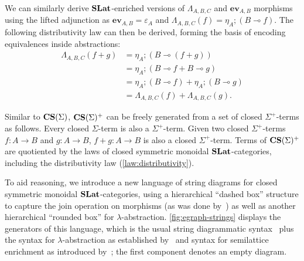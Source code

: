 We can similarly derive $\mathbf{SLat}$-enriched versions of  $\Lambda_{A,B,C}$ and $\textbf{ev}_{A,B}$ morphisms using the lifted adjunction as $\textbf{ev}_{A,B} = \varepsilon_{A}$ and $\Lambda_{A,B,C}(f) = \eta_A; (B \multimap{} f)$.
The following distributivity law can then be derived, forming the basis of encoding equivalences inside abstractions:
\begin{equation}
	\begin{aligned}
		\Lambda_{A,B,C}(f + g) & = \eta_A;(B \multimap (f + g))                    \\
		                       & = \eta_A;(B \multimap f + B \multimap g)          \\
		                       & = \eta_A;(B \multimap f) + \eta_A;(B \multimap g) \\
		                       & = \Lambda_{A,B,C}(f) + \Lambda_{A,B,C}(g).
	\end{aligned}%
	\label{law:distributivity}
\end{equation}

Similar to $\mathbf{CS}(\Sigma)$, $\mathbf{CS}(\Sigma)^{+}$ can be freely generated from a set of closed $\Sigma^{+}$-terms as follows.
Every closed $\Sigma$-term is also a $\Sigma^{+}$-term.
Given two closed $\Sigma^{+}$-terms $f\colon A \to B$ and $g\colon A \to B$, $f + g\colon A \to B$ is also a closed $\Sigma^{+}$-term.
Terms of $\mathbf{CS}(\Sigma)^{+}$ are quotiented by the laws of closed symmetric monoidal $\mathbf{SLat}$-categories, including the distributivity law (\autoref{law:distributivity}).

To aid reasoning, we introduce a new language of string diagrams for closed symmetric monoidal $\mathbf{SLat}$-categories, using a hierarchical \enquote{dashed box} structure to capture the join operation on morphisms (as was done by~\citet{ghica2024equivalencehypergraphsegraphsmonoidal}) as well as another hierarchical \enquote{rounded box} for $\lambda$-abstraction.
\autoref{fig:egraph-strings} displays the generators of this language, which is the usual string diagrammatic syntax~\cite{Selinger_2010} plus the syntax for $\lambda$-abstraction as established by~\citet{ghica2024stringdiagramslambdacalculifunctional} and syntax for semilattice enrichment as introduced by~\citet{ghica2024equivalencehypergraphsegraphsmonoidal}; the first component denotes an empty diagram.


